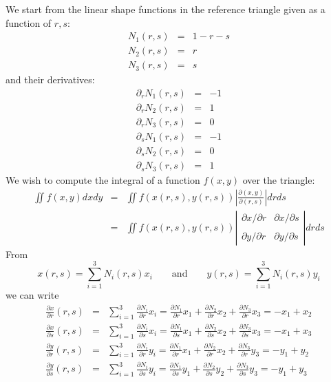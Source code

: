 We start from the linear shape functions in the reference triangle given as a function of $r,s$:
\begin{eqnarray}
N_1(r,s) &=& 1-r-s \\
N_2(r,s) &=& r \\
N_3(r,s) &=& s
\end{eqnarray}
and their derivatives:
\begin{eqnarray}
\partial_r N_1(r,s) &=& -1 \\
\partial_r N_2(r,s) &=& 1 \\
\partial_r N_3(r,s) &=& 0 \\
\partial_s N_1(r,s) &=& -1 \\
\partial_s N_2(r,s) &=& 0\\
\partial_s N_3(r,s) &=& 1
\end{eqnarray}
We wish to compute the integral of a function $f(x,y)$ over the triangle:
\begin{eqnarray}
\iint f(x,y) dx dy 
&=& \iint f(x(r,s),y(r,s)) \left| \frac{\partial (x,y)}{\partial (r,s) } \right|  dr ds \\
&=& \iint f(x(r,s),y(r,s)) 
\left| 
\begin{array}{cc}
\partial x/\partial r & \partial x/\partial s \\ \\
\partial y/\partial r & \partial y/\partial s 
\end{array}
\right|  dr ds 
\end{eqnarray}
From 
\[
x(r,s)=\sum_{i=1}^3 N_i(r,s) x_i 
\qquad \text{and} \qquad 
y(r,s)=\sum_{i=1}^3 N_i(r,s) y_i 
\]
we can write
\begin{eqnarray}
\frac{\partial x}{\partial r}(r,s)
&=&\sum_{i=1}^3 \frac{\partial N_i}{\partial r} x_i
=\frac{\partial N_1}{\partial r} x_1+\frac{\partial N_2}{\partial r} x_2+\frac{\partial N_3}{\partial r} x_3
=- x_1+ x_2 \nonumber\\
\frac{\partial x}{\partial s}(r,s)
&=&\sum_{i=1}^3 \frac{\partial N_i}{\partial s} x_i
=\frac{\partial N_1}{\partial s} x_1+\frac{\partial N_2}{\partial s} x_2+\frac{\partial N_3}{\partial s} x_3
=- x_1+ x_3
\nonumber\\
\frac{\partial y}{\partial r}(r,s)
&=&\sum_{i=1}^3 \frac{\partial N_i}{\partial r} y_i
=\frac{\partial N_1}{\partial r} x_1+\frac{\partial N_2}{\partial r} x_2+\frac{\partial N_3}{\partial r} y_3
=- y_1+ y_2
\nonumber\\
\frac{\partial y}{\partial s}(r,s)
&=&\sum_{i=1}^3 \frac{\partial N_i}{\partial s} y_i
=\frac{\partial N_1}{\partial s} y_1+\frac{\partial N_2}{\partial s} y_2+\frac{\partial N_3}{\partial s} y_3
=- y_1+ y_3
\end{eqnarray}
